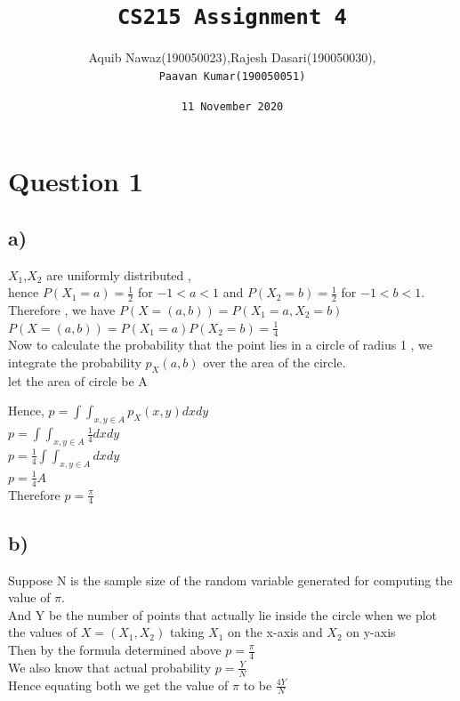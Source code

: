 \documentclass{article}
\title{\huge\texttt{CS215 Assignment 4}}
\author{Aquib Nawaz(190050023),Rajesh Dasari(190050030),\\\texttt{Paavan Kumar(190050051)}}
\date{\texttt{11 November 2020}}
\begin{document}
\maketitle

\section* {Question 1}
\subsection* {a)}
$X_1$,$X_2$ are uniformly distributed ,\\hence $P(X_1=a) = \frac{1}{2}$ for $-1<a<1$ and $P(X_2=b) = \frac{1}{2}$ for $-1<b<1$.
\\
Therefore , we have $P(X = (a,b)) = P(X_1=a,X_2=b)$\\
$P(X=(a,b)) = P(X_1=a)P(X_2=b) = \frac{1}{4}$
\\
Now to calculate the probability that the point lies in a circle of radius 1 , we integrate the probability $p_X(a,b)$ over the area of the circle.\\ let the area of circle be A\par
Hence, $p = \int\int_{x,y \in A} p_X(x,y) dx dy$\\
$p = \int\int_{x,y \in A} \frac{1}{4} dx dy$\\
$p = \frac{1}{4} \int\int_{x,y \in A} dx dy$\\
$p = \frac{1}{4}A$\\
Therefore  $\boxed{p = \frac{\pi}{4}}$
\subsection*{b)}
Suppose N is the sample size of the random variable generated for computing the value of $\pi$.\\
And Y be the number of points that actually lie inside the circle when we plot the values of $X=(X_1,X_2)$ taking $X_1$ on the x-axis and $X_2$ on y-axis\\
Then by the formula determined above $p = \frac{\pi}{4}$\\
We also know  that actual probability $p = \frac{Y}{N}$ \\
Hence equating both we get the value of $\pi$  to be $\frac{4Y}{N}$
\end{document}
